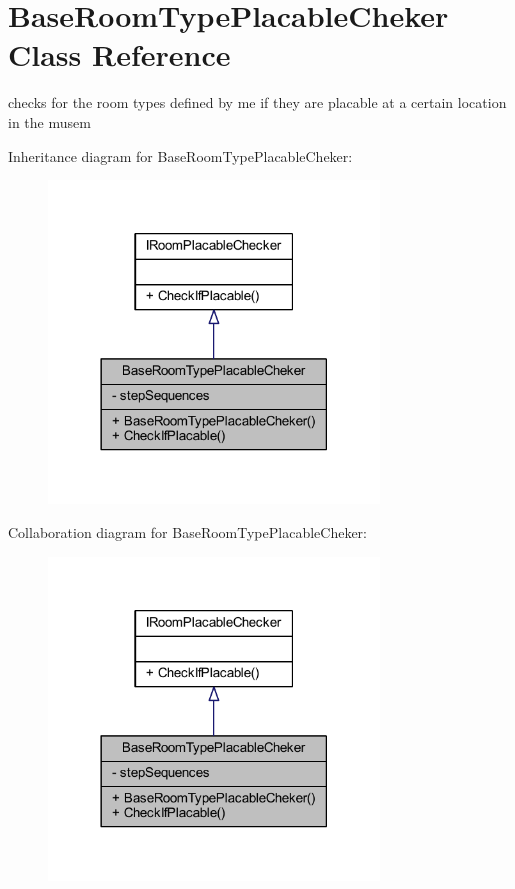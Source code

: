 \hypertarget{class_base_room_type_placable_cheker}{}\section{Base\+Room\+Type\+Placable\+Cheker Class Reference}
\label{class_base_room_type_placable_cheker}


checks for the room types defined by me if they are placable at a certain location in the musem  




Inheritance diagram for Base\+Room\+Type\+Placable\+Cheker\+:\nopagebreak
\begin{figure}[H]
\begin{center}
\leavevmode
\includegraphics[width=249pt]{class_base_room_type_placable_cheker__inherit__graph}
\end{center}
\end{figure}


Collaboration diagram for Base\+Room\+Type\+Placable\+Cheker\+:\nopagebreak
\begin{figure}[H]
\begin{center}
\leavevmode
\includegraphics[width=249pt]{class_base_room_type_placable_cheker__coll__graph}
\end{center}
\end{figure}
